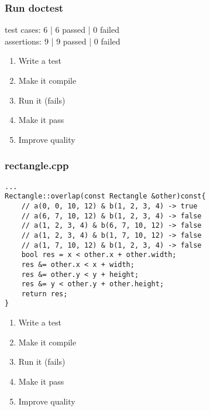 \begin{frame}[fragile]
\frametitle{Run doctest}
\begin{minipage}[t]{0.48\linewidth}
test cases: 6 | 6 passed | 0 failed\\
assertions: 9 | 9 passed | 0 failed\\
\end{minipage}\hfill
\begin{minipage}[t]{0.28\linewidth}
  \small
  \begin{enumerate} 
    \item \textcolor{deadcolor}{Write a test}
    \item \textcolor{deadcolor}{Make it compile}
    \item \textcolor{deadcolor}{Run it (fails)}
    \item \textcolor{activecolor}{Make it pass}
    \item \textcolor{deadcolor}{Improve quality}
  \end{enumerate} 
\end{minipage}
\end{frame}


\begin{frame}[fragile]
\frametitle{rectangle.cpp}
\begin{minipage}[t]{0.48\linewidth}
\begin{lstlisting}
...
Rectangle::overlap(const Rectangle &other)const{
    // a(0, 0, 10, 12) & b(1, 2, 3, 4) -> true
    // a(6, 7, 10, 12) & b(1, 2, 3, 4) -> false
    // a(1, 2, 3, 4) & b(6, 7, 10, 12) -> false
    // a(1, 2, 3, 4) & b(1, 7, 10, 12) -> false
    // a(1, 7, 10, 12) & b(1, 2, 3, 4) -> false
    bool res = x < other.x + other.width;
    res &= other.x < x + width;
    res &= other.y < y + height;
    res &= y < other.y + other.height;
    return res;
}
\end{lstlisting}
\end{minipage}\hfill
\begin{minipage}[t]{0.28\linewidth}
  \small
  \begin{enumerate} 
    \item \textcolor{deadcolor}{Write a test}
    \item \textcolor{deadcolor}{Make it compile}
    \item \textcolor{deadcolor}{Run it (fails)}
    \item \textcolor{deadcolor}{Make it pass}
    \item \textcolor{activecolor}{Improve quality}
  \end{enumerate} 
\end{minipage}
\end{frame}


